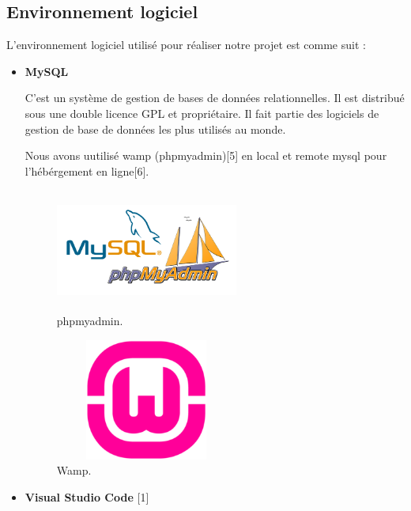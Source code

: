   \subsection{Environnement logiciel}


L'environnement logiciel utilis\'{e} pour r\'{e}aliser notre projet est comme suit : \newline

\begin{itemize}
  
 

\item {  \textbf{MySQL} }


C'est un syst\`{e}me de gestion de bases de données relationnelles. Il est distribu\'{e}
sous une double licence GPL et propri\'{e}taire. Il fait partie des logiciels de gestion
de base de donn\'{e}es les plus utilis\'{e}s au monde.

Nous avons uutilis\'{e} wamp (phpmyadmin)[5]  en local et remote mysql pour l'h\'{e}b\'{e}rgement en ligne[6]. \newline



\FloatBarrier
\begin{figure}[H]
\center
\includegraphics[width=6cm,height=4cm]{./figures/teklogos/phpmyadmin.png}
\caption{phpmyadmin.}
\end{figure}
\FloatBarrier

\FloatBarrier
\begin{figure}[H]
\center
\includegraphics[width=6cm,height=4cm]{./figures/teklogos/wamp.png}
\caption{Wamp.}
\end{figure}
\FloatBarrier

\item {  \textbf{Visual Studio Code} } [1]


\end{itemize}
